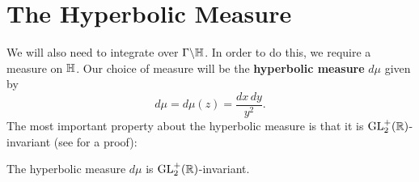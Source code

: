   \section{The Hyperbolic Measure}
    We will also need to integrate over $\Gamma\backslash\mathbb{H}$. In order to do this, we require a measure on $\mathbb{H}$. Our choice of measure will be the \textbf{hyperbolic measure} $d\mu$ given by
    \[
      d\mu = d\mu(z) = \frac{dx\,dy}{y^{2}}.
    \]
    The most important property about the hyperbolic measure is that it is $\mathrm{GL}_{2}^{+}(\mathbb{R})$-invariant (see \cite{diamond2005first} for a proof):

    \begin{proposition}
      The hyperbolic measure $d\mu$ is $\mathrm{GL}_{2}^{+}(\mathbb{R})$-invariant.
    \end{proposition}

